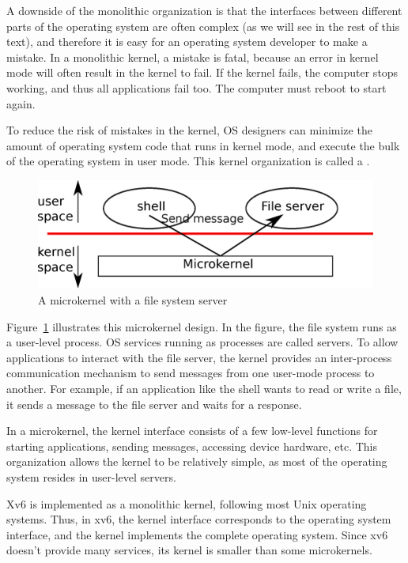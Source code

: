 A downside of the monolithic organization is that the interfaces between
different parts of the operating system are often complex (as we will see in the
rest of this text), and therefore it is easy for an operating system developer
to make a mistake.  In a monolithic kernel, a mistake is fatal, because an error
in kernel mode will often result in the kernel to fail.  If the kernel fails,
the computer stops working, and thus all applications fail too.  The computer
must reboot to start again.

To reduce the risk of mistakes in the kernel, OS designers can minimize the
amount of operating system code that runs in kernel mode, and execute the
bulk of the operating system in user mode.
This kernel organization is called a
.

\begin{figure}[t]
\center
\includegraphics[scale=0.5]{fig/mkernel.eps}
\caption{A microkernel with a file system server}
\label{fig:mkernel}
\end{figure}

Figure~\ref{fig:mkernel}
illustrates this microkernel design.  In the figure, the file system runs as a
user-level process.  OS services running as processes are called servers.
To allow applications to interact with the
file server, the kernel provides an inter-process communication
mechanism to send messages from one
user-mode process to another.  For example, if an application like the shell
wants to read or write a file, it sends a message to the file server and waits
for a response. 

In a microkernel, the kernel interface consists of a few low-level
functions for starting applications, sending messages,
accessing device hardware, etc.  This organization allows the kernel to be 
relatively simple, as most of the operating system
resides in user-level servers.

Xv6 is
implemented as a monolithic kernel, following most Unix operating systems.
Thus, in xv6, the kernel interface corresponds to the operating system
interface, and the kernel implements the complete operating system.  Since 
xv6 doesn't provide many services, its kernel is smaller than some
microkernels.
